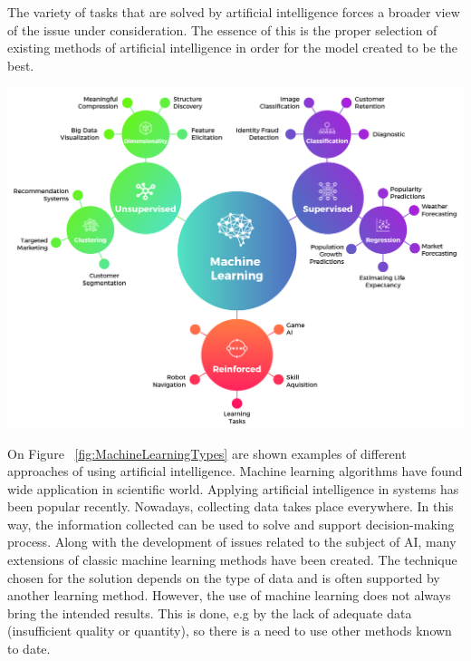 The variety of tasks that are solved by artificial intelligence forces a broader view of the issue under consideration. The essence of this is the proper selection of existing methods of artificial intelligence in order for the model created to be the best.  


\begin{center}
	\includegraphics[width=1\textwidth, keepaspectratio]{diagrams/machine_learning_model.png}
	\center
	\label{fig:MachineLearningTypes}
\end{center}

On Figure ~\ref{fig:MachineLearningTypes} are shown examples of different approaches of using artificial intelligence. Machine learning algorithms have found wide application in scientific world. 
Applying artificial intelligence in systems has been popular recently. Nowadays, collecting data takes place everywhere. In this way, the information collected can be used to solve and support decision-making process. Along with the development of issues related to the subject of AI, many extensions of classic machine learning methods have been created.
The technique chosen for the solution depends on the type of data and is  often supported by another learning method. However, the use of machine learning does not always bring the intended results. This is done, e.g by the lack of adequate data (insufficient quality or quantity), so there is a need to use other methods known to date.


